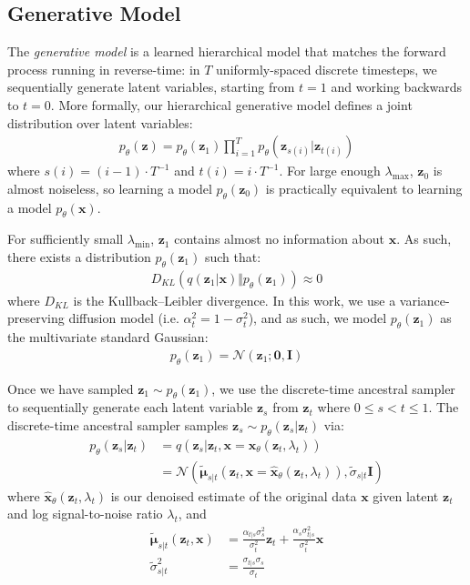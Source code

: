 \documentclass[ oneside,%
                    author={George Herbert},
                    degree={MSci},
                     title={Video Diffusion Models for Climate Simulations},
                  subtitle={}]{dissertation}
\begin{document}
\subsection{Generative Model}
\label{sec:background_diffusion_reverse}

The \textit{generative model} is a learned hierarchical model that matches the forward process running in reverse-time: in $T$ uniformly-spaced discrete timesteps, we sequentially generate latent variables, starting from $t=1$ and working backwards to $t=0$. More formally, our hierarchical generative model defines a joint distribution over latent variables:
\begin{align}
      p_\theta(\mathbf{z})=p_\theta(\mathbf{z}_1)\prod_{i=1}^T p_\theta(\mathbf{z}_{s(i)}|\mathbf{z}_{t(i)})
\end{align}
where $s(i)=(i - 1)\cdot T^{-1}$ and $t(i)=i\cdot T^{-1}$. For large enough $\lambda_{\max}$, $\mathbf{z}_0$ is almost noiseless, so learning a model $p_\theta(\mathbf{z}_0)$ is practically equivalent to learning a model $p_\theta(\mathbf{x})$. 

For sufficiently small $\lambda_{\min}$, $\mathbf{z}_1$ contains almost no information about $\mathbf{x}$. As such, there exists a distribution $p_\theta(\mathbf{z}_1)$ such that:
\begin{align}
      D_{KL}(q(\mathbf{z}_1|\mathbf{x})\Vert p_\theta(\mathbf{z}_1))\approx 0
\end{align}
where $D_{KL}$ is the Kullback--Leibler divergence. In this work, we use a variance-preserving diffusion model (i.e. $\alpha_t^2=1-\sigma_t^2$), and as such, we model $p_\theta(\mathbf{z}_1)$ as the multivariate standard Gaussian:
\begin{align}
      p_\theta(\mathbf{z}_1)=\mathcal{N}(\mathbf{z}_1;\mathbf{0}, \mathbf{I})
\end{align}

Once we have sampled $\mathbf{z}_1\sim p_\theta(\mathbf{z}_1)$, we use the discrete-time ancestral sampler \cite{DDPM_Ho} to sequentially generate each latent variable $\mathbf{z}_s$ from $\mathbf{z}_t$ where $0\le s < t \le 1$. The discrete-time ancestral sampler samples $\mathbf{z}_s\sim p_\theta(\mathbf{z}_s|\mathbf{z}_t)$ via:
\begin{align}
      p_\theta(\mathbf{z}_s|\mathbf{z}_t)&=q(\mathbf{z}_s|\mathbf{z}_t,\mathbf{x}=\hat{\mathbf{x}}_\theta(\mathbf{z}_t,\lambda_t))\\
      &=\mathcal{N}\left(\tilde{\boldsymbol\mu}_{s|t}(\mathbf{z}_t,\mathbf{x}=\hat{\mathbf{x}}_\theta(\mathbf{z}_t,\lambda_t)), \tilde{\sigma}_{s|t}\mathbf{I}\right)
\end{align}
where $\hat{\mathbf{x}}_\theta(\mathbf{z}_t,\lambda_t)$ is our denoised estimate of the original data $\mathbf{x}$ given latent $\mathbf{z}_t$ and log signal-to-noise ratio $\lambda_t$, and
\begin{align}
      \tilde{\boldsymbol\mu}_{s|t}(\mathbf{z}_t,\mathbf{x})&=\frac{\alpha_{t|s}\sigma_s^2}{\sigma_t^2}\mathbf{z}_t+\frac{\alpha_s\sigma_{t|s}^2}{\sigma_t^2}\mathbf{x}\\
      \tilde{\sigma}_{s|t}^2&=\frac{\sigma_{t|s}\sigma_s}{\sigma_t}
\end{align}
\end{document}
